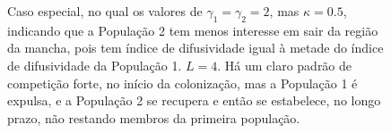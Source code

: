 \documentclass{article}
\begin{document}
	\begin{figure}[h]
		\centering
		\qquad
		\caption{Caso especial, no qual os valores de $\gamma_1 = \gamma_2 = 2$, mas $\kappa = 0.5$, indicando que a População 2 tem menos interesse em sair da região da mancha, pois tem índice de difusividade igual à metade do índice de difusividade da População 1. $L=4$. Há um claro padrão de competição forte, no início da colonização, mas a População 1 é expulsa, e a População 2 se recupera e então se estabelece, no longo prazo, não restando membros da primeira população.}
		\label{fig:Two-P-12-Elimination-Diffusion-Time}
	\end{figure}	
	
\end{document}
